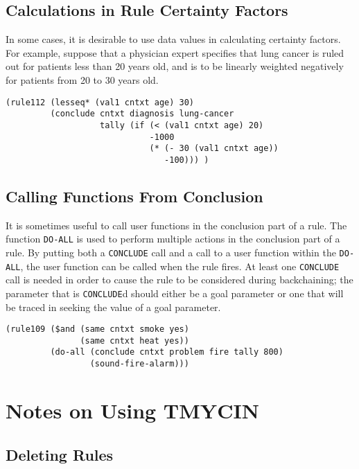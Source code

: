 \subsection{Calculations in Rule Certainty Factors}

In some cases, it is desirable to use data values in calculating certainty
factors.  For example, suppose that a physician expert specifies that
lung cancer is ruled out for patients less than 20 years old, and is to
be linearly weighted negatively for patients from 20 to 30 years old.

\begin{verbatim}
(rule112 (lesseq* (val1 cntxt age) 30)
         (conclude cntxt diagnosis lung-cancer
                   tally (if (< (val1 cntxt age) 20)
                             -1000
                             (* (- 30 (val1 cntxt age))
                                -100))) )
\end{verbatim}

\subsection{Calling Functions From Conclusion}

It is sometimes useful to call user functions in the conclusion part of a rule.
The function {\tt DO-ALL} is used to perform multiple actions in the conclusion
part of a rule.  By putting both a {\tt CONCLUDE} call and a call to a user
function within the {\tt DO-ALL}, the user function can be called when the rule
fires.  At least one {\tt CONCLUDE} call is needed in order to cause the rule
to be considered during backchaining; the parameter that is {\tt CONCLUDE}d
should either be a goal parameter or one that will be traced in seeking the
value of a goal parameter.

\begin{verbatim}
(rule109 ($and (same cntxt smoke yes)
               (same cntxt heat yes))
         (do-all (conclude cntxt problem fire tally 800)
                 (sound-fire-alarm)))
\end{verbatim}

\section{Notes on Using TMYCIN}

\subsection{Deleting Rules}

